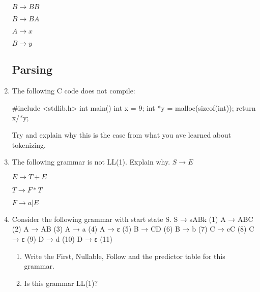 \documentclass[12pt]{article}
\begin{document}
\begin{enumerate}
$ B \rightarrow BB $

$ B \rightarrow BA $

$ A \rightarrow x $

$ B \rightarrow y $
\subsection{Parsing}
\item The following C code does not compile:
\begin{spverbatim}
	#include <stdlib.h>
	int main(){
		int x = 9;
		int *y = malloc(sizeof(int));
		return x/*y;
	}
\end{spverbatim}
Try and explain why this is the case from what you ave learned about tokenizing.
\item The following grammar is not LL(1). Explain why.
$ S \rightarrow E$

$ E \rightarrow T + E $

$ T \rightarrow F*T $

$ F \rightarrow a|E $

\item Consider the following grammar with start state S.
S → sABk (1)
A → ABC (2)
A → AB (3)
A → a (4)
A → ε (5)
B → CD (6)
B → b (7)
C → cC (8)
C → ε (9)
D → d (10)
D → ε (11)
\begin{enumerate}
	\item Write the First, Nullable, Follow and the predictor table for this grammar.
	\item Is this grammar LL(1)?
\end{enumerate}
\end{enumerate}

\
\end{document}
